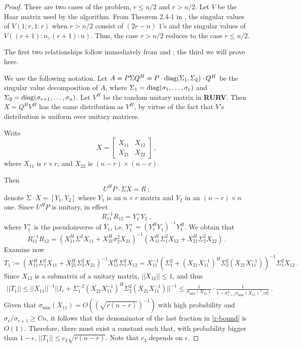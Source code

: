 \documentclass{article}
\newcommand{\diag}{{\rm diag}}
\theoremstyle{definition}
\begin{document}
\begin{proof} There are two cases of the problem, $r \leq n/2$ and $r> n/2$. 
Let $V$ be the Haar matrix used by the algorithm. 
From Theorem 2.4-1 in \cite{golubvanloan}, 
the singular values of $V(1;r, 1:r)$ when $r>n/2$ consist 
of $(2r-n)$ $1$'s and the singular values of $V((r+1):n ,(r+1):n)$. 
Thus, the case $r>n/2$ reduces to the case $r \leq n/2$.

The first two relationships follow immediately from \cite{DDH07} and \cite{dumitriu10a}; the third we will prove here. 

We use the following notation. Let $A = P \Sigma Q^{H} = P \cdot \diag(\Sigma_1, \Sigma_2) \cdot Q^{H}$ be the singular value decomposition of $A$, where $\Sigma_1 = \diag(\sigma_1, \ldots, \sigma_r)$ and $\Sigma_2 = \diag(\sigma_{r+1}, \ldots, \sigma_n)$. Let $V^H$ be the random unitary matrix in \textbf{RURV}. Then $X = Q^{H}V^{H}$ has the same distribution as $V^{H}$, by virtue of the fact that $V$'s distribution is uniform over unitary matrices. 

Write 
\[
X = \left [ \begin{array}{cc} X_{11} & X_{12} \\ X_{21} & X_{22} \end{array} \right ]~,
\]
where $X_{11}$ is $r \times r$, and $X_{22}$ is $(n-r) \times (n-r)$. 

Then 
\[
U^H P \cdot \Sigma X = R~;
\]
denote $\Sigma \cdot X = [Y_1, Y_2]$ where $Y_1$ is an $n \times r$ matrix and $Y_2$ in an $(n-r) \times n$ one. Since $U^{H}P$ is unitary, in effect 
\[
R_{11}^{-1} R_{12} = Y_1^{+} Y_2~,
\]
where $Y_1^{+}$ is the pseudoinverse of $Y_1$, i.e. $Y_1^{+} = (Y_1^H Y_1)^{-1} Y_1^H$. We obtain that
\[
R_{11}^{-1} R_{12} = \left (X_{11}^{H} \Sigma^2 X_{11} + X_{21}^{H} \sigma_2^2 X_{21} \right)^{-1} \left ( X_{11}^{H} \Sigma_1^2 X_{12} + X_{21}^{H} \Sigma_2^2 X_{22} \right)~.
\]
Examine now
\[
T_1 := \left (X_{11}^{H} \Sigma_1^2 X_{11} + X_{21}^H \Sigma^2_2 X_{21} \right )^{-1} X_{11}^{H} \Sigma_1^2 X_{12} = X_{11}^{-1} \left ( \Sigma_1^2 + (X_{21} X_{11}^{-1})^{H} \Sigma_2^2 (X_{21} X_{11}^{-1}) \right )^{-1} \Sigma_1^2 X_{12}~.
\]
Since $X_{12}$ is a submatrix of a unitary matrix, $||X_{12}|| \leq 1$, and thus
\begin{eqnarray} \label{r-bound}
||T_1|| \leq ||X_{11}||^{-1}  || I_r + \Sigma_1^{-2} (X_{21} X_{11}^{-1})^{H} \Sigma_2^2 (X_{21} X_{11}^{-1}) ||^{-1} \leq \frac{1}{\sigma_{\min}(X_{11})} \cdot \frac{1}{1 - \sigma_{r+1}^2 \sigma_{\min}(X_{11})^2 /\sigma_r^2}~.
\end{eqnarray}
Given that $\sigma_{\min}(X_{11}) = O( (\sqrt{r (n-r)})^{-1})$ with high probability and $\sigma_r /\sigma_{r+1} \geq C n$, it follows that the denominator of the last fraction in \eqref{r-bound} is $O(1)$. Therefore, there must exist a constant such that, with probability bigger than $1 - \epsilon$, $||T_1|| \leq c_3 \sqrt{r(n-r)}$. Note that $c_3$ depends on $\epsilon$.


\end{proof}
\end{document}
